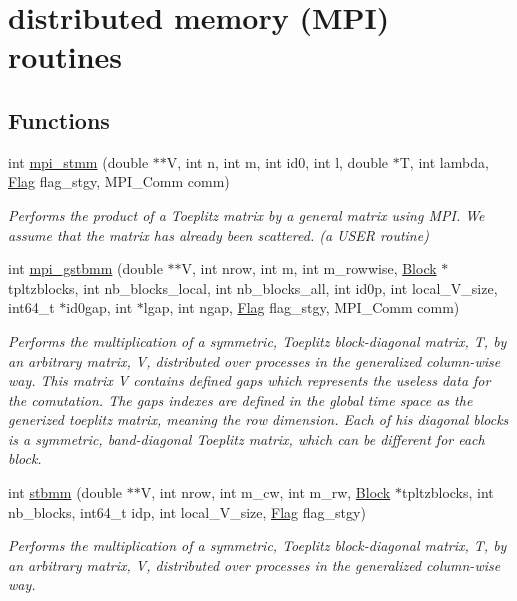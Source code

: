 \hypertarget{group__group12}{\section{distributed memory (M\-P\-I) routines}
\label{group__group12}
}
\subsection*{Functions}
\begin{DoxyCompactItemize}
\item 
int \hyperlink{group__group12_gadd9394c94ea5769dc0a2064f48dfc94c}{mpi\-\_\-stmm} (double $\ast$$\ast$V, int n, int m, int id0, int l, double $\ast$T, int lambda, \hyperlink{structFlag}{Flag} flag\-\_\-stgy, M\-P\-I\-\_\-\-Comm comm)
\begin{DoxyCompactList}\small\item\em Performs the product of a Toeplitz matrix by a general matrix using M\-P\-I. We assume that the matrix has already been scattered. (a U\-S\-E\-R routine) \end{DoxyCompactList}\item 
int \hyperlink{group__group12_ga7c3bdb98f0e937e6e84c8652e101acac}{mpi\-\_\-gstbmm} (double $\ast$$\ast$V, int nrow, int m, int m\-\_\-rowwise, \hyperlink{structBlock}{Block} $\ast$tpltzblocks, int nb\-\_\-blocks\-\_\-local, int nb\-\_\-blocks\-\_\-all, int id0p, int local\-\_\-\-V\-\_\-size, int64\-\_\-t $\ast$id0gap, int $\ast$lgap, int ngap, \hyperlink{structFlag}{Flag} flag\-\_\-stgy, M\-P\-I\-\_\-\-Comm comm)
\begin{DoxyCompactList}\small\item\em Performs the multiplication of a symmetric, Toeplitz block-\/diagonal matrix, T, by an arbitrary matrix, V, distributed over processes in the generalized column-\/wise way. This matrix V contains defined gaps which represents the useless data for the comutation. The gaps indexes are defined in the global time space as the generized toeplitz matrix, meaning the row dimension. Each of his diagonal blocks is a symmetric, band-\/diagonal Toeplitz matrix, which can be different for each block. \end{DoxyCompactList}\item 
int \hyperlink{group__group12_gab51a5dfa887d47b4ce627eb0e01a2e0a}{stbmm} (double $\ast$$\ast$V, int nrow, int m\-\_\-cw, int m\-\_\-rw, \hyperlink{structBlock}{Block} $\ast$tpltzblocks, int nb\-\_\-blocks, int64\-\_\-t idp, int local\-\_\-\-V\-\_\-size, \hyperlink{structFlag}{Flag} flag\-\_\-stgy)
\begin{DoxyCompactList}\small\item\em Performs the multiplication of a symmetric, Toeplitz block-\/diagonal matrix, T, by an arbitrary matrix, V, distributed over processes in the generalized column-\/wise way. \end{DoxyCompactList}\end{DoxyCompactItemize}


